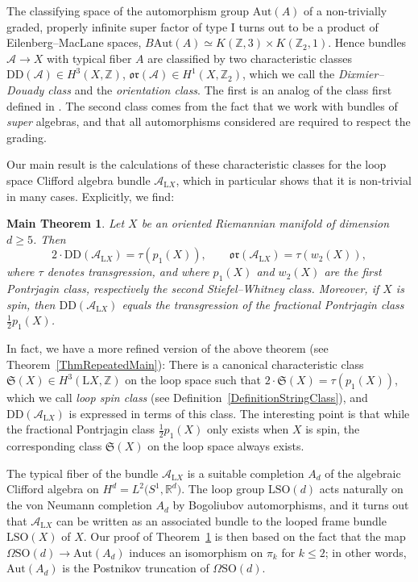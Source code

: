 \documentclass[10pt,a4paper]{amsart}
\numberwithin{equation}{section}
\newtheorem{Maintheorem}[Theorem]{Main Theorem}
 { \theoremstyle{definition}
\newtheorem{Definition}[Theorem]{Definition}
\newtheorem{Note}[Theorem]{Note}
\newtheorem{Example}[Theorem]{Example}
\newtheorem{Remark}[Theorem]{Remark} }
\newcommand{\R}{\mathbb{R}}
\newcommand{\Z}{\mathbb{Z}}
\newcommand{\SO}{\mathrm{SO}}
\newcommand{\Aut}{\mathrm{Aut}}
\renewcommand{\L}{\mathrm{L}}
\newcommand{\DD}{\mathrm{DD}}
\newcommand{\oclass}{\mathfrak{or}}
\begin{document}
The classifying space of the automorphism group $\Aut(A)$ of a non-trivially graded, properly infinite super factor of type I turns out to be a product of Eilenberg--MacLane spaces, $B\Aut(A) \simeq K(\Z, 3) \times K(\Z_2, 1)$.
Hence bundles $\mathcal{A} \to X$ with typical fiber $A$ are classified by two characteristic classes
$
\DD(\mathcal{A}) \in H^3(X, \Z)$, $\oclass(\mathcal{A}) \in H^1(X, \Z_2)$,
which we call the \emph{Dixmier--Douady class} and the \emph{orientation class}.
The first is an analog of the class first defined in \cite{DixmierDouady}.
The second class comes from the fact that we work with bundles of \emph{super} algebras, and that all automorphisms considered are required to respect the grading.

Our main result is the calculations of these characteristic classes for the loop space Clifford algebra bundle $\mathcal{A}_{\L X}$, which in particular shows that it is non-trivial in many cases.
Explicitly, we find:

\begin{Maintheorem} \label{ThmObstructionClass}
Let $X$ be an oriented Riemannian manifold of dimension $d\geq 5$.
Then
\begin{equation*}
2\cdot \mathrm{DD}(\mathcal{A}_{\L X}) = \tau(p_1(X)),\qquad \oclass(\mathcal{A}_{\L X}) = \tau(w_2(X)),
\end{equation*}
where $\tau$ denotes transgression, and where $p_1(X)$ and $w_2(X)$ are the first Pontrjagin class, respectively the second Stiefel--Whitney class.
Moreover, if $X$ is spin, then $\mathrm{DD}(\mathcal{A}_{\L X})$ equals the transgression of the fractional Pontrjagin class $\frac{1}{2}p_1(X)$.
\end{Maintheorem}

In fact, we have a more refined version of the above theorem (see Theorem~\ref{ThmRepeatedMain}):
There is a canonical characteristic class $\mathfrak{S}(X) \in H^3(\L X, \Z)$ on the loop space such that $2 \cdot \mathfrak{S}(X) = \tau(p_1(X))$, which we call \emph{loop spin class} (see Definition~\ref{DefinitionStringClass}),
and $\DD(\mathcal{A}_{\L X})$ is expressed in terms of this class.
The interesting point is that while the fractional Pontrjagin class $\frac{1}{2}p_1(X)$ only exists when $X$ is spin, the corresponding class $\mathfrak{S}(X)$ on the loop space always exists.

The typical fiber of the bundle $\mathcal{A}_{\L X}$ is a suitable completion $A_d$ of the algebraic Clifford algebra on $H^d = L^2\big(S^1, \R^d\big)$.
The loop group $\L\SO(d)$ acts naturally on the von Neumann completion $A_d$ by Bogoliubov automorphisms, and it turns out that $\mathcal{A}_{\L X}$ can be written as an associated bundle to the looped frame bundle $\L\SO(X)$ of $X$.
Our proof of Theorem~\ref{ThmObstructionClass} is then based on the fact that the map $\Omega\SO(d) \to \Aut(A_d)$ induces an isomorphism on $\pi_k$ for $k \leq 2$; in other words, $\Aut(A_d)$ is the Postnikov truncation of $\Omega\SO(d)$.
\end{document}

